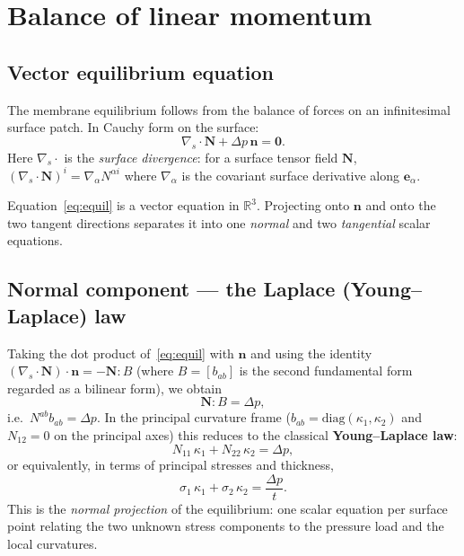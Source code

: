 \documentclass[11pt]{article}
\newcommand{\vv}[1]{\bm{#1}}          %
\newcommand{\nn}{\vv{n}}               %
\newcommand{\Nb}{\mathbf{N}}           %
\newcommand{\kone}{\kappa_1}
\newcommand{\ktwo}{\kappa_2}
\newcommand{\divs}{\nabla_{\!s}\!\cdot}
\newcommand{\R}{\mathbb{R}}
\begin{document}
\section{Balance of linear momentum}
\label{sec:balance}

\subsection{Vector equilibrium equation}

The membrane equilibrium follows from the balance of forces on an infinitesimal
surface patch.  In Cauchy form on the surface:
\begin{equation}
  \divs\Nb + \Delta p\,\nn = \vv{0}.
  \label{eq:equil}
\end{equation}
Here $\divs$ is the \emph{surface divergence}: for a surface tensor field
$\Nb$, $(\divs\Nb)^i = \nabla_\alpha N^{\alpha i}$ where $\nabla_\alpha$ is
the covariant surface derivative along $\vv{e}_\alpha$.

Equation~\eqref{eq:equil} is a vector equation in $\R^3$.  Projecting onto
$\nn$ and onto the two tangent directions separates it into one \emph{normal}
and two \emph{tangential} scalar equations.

\subsection{Normal component --- the Laplace (Young--Laplace) law}
\label{sec:normal}

Taking the dot product of~\eqref{eq:equil} with $\nn$ and using the identity
$(\divs\Nb)\cdot\nn = -\Nb:B$ (where $B=[b_{ab}]$ is the second fundamental
form regarded as a bilinear form), we obtain
\begin{equation}
  \Nb : B = \Delta p,
  \label{eq:laplace-tensor}
\end{equation}
i.e.\ $N^{ab}b_{ab}=\Delta p$.  In the principal curvature frame
($b_{ab}=\mathrm{diag}(\kone,\ktwo)$ and $N_{12}=0$ on the principal axes) this
reduces to the classical \textbf{Young--Laplace law}:
\begin{equation}
  \boxed{N_{11}\,\kone + N_{22}\,\ktwo = \Delta p,}
  \label{eq:laplace}
\end{equation}
or equivalently, in terms of principal stresses and thickness,
\begin{equation}
  \sigma_1\,\kone + \sigma_2\,\ktwo = \frac{\Delta p}{t}.
  \label{eq:laplace-sigma}
\end{equation}
This is the \emph{normal projection} of the equilibrium: one scalar equation
per surface point relating the two unknown stress components to the pressure
load and the local curvatures.
\end{document}
